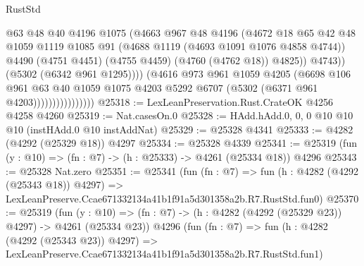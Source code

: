 \begin{lexlean}{RustStd}
\begin{coremodule}
                                    @63
                                    @48
                                    @40
                                    @4196
                                    @1075
                                    (@4663
                                      @967
                                      @48
                                      @4196
                                      (@4672
                                        @18
                                        @65
                                        @42
                                        @48
                                        @1059
                                        @1119
                                        @1085
                                        @91
                                        (@4688 @1119 (@4693 @1091 @1076 @4858 @4744))
                                        @4490
                                        (@4751 @4451)
                                        (@4755 @4459)
                                        (@4760 (@4762 @18))
                                        @4825))
                                    @4743))
                                (@5302 (@6342 @961 @1295))))
                            (@4616
                              @973
                              @961
                              @1059
                              @4205
                              (@6698
                                @106
                                @961
                                @63
                                @40
                                @1059
                                @1075
                                @4203
                                @5292
                                @6707
                                (@5302 (@6371 @961 @4203))))))))))))))))
@25318 := LexLeanPreservation.Rust.CrateOK @4256 @4258 @4260
@25319 := Nat.casesOn.{0}
@25328 := HAdd.hAdd.{0, 0, 0} @10 @10 @10 (instHAdd.{0} @10 instAddNat)
@25329 := @25328 @4341
@25333 := @4282 (@4292 (@25329 @18)) @4297
@25334 := @25328 @4339
@25341 := @25319 (fun (y : @10) => (fn : @7) -> (h : @25333) -> @4261 (@25334 @18)) @4296
@25343 := @25328 Nat.zero
@25351 := @25341
    (fun (fn : @7) =>
    fun (h : @4282 (@4292 (@25343 @18)) @4297) =>
    LexLeanPreserve.Ccae671332134a41b1f91a5d301358a2b.R7.RustStd.fun0)
@25370 := @25319
    (fun (y : @10) => (fn : @7) -> (h : @4282 (@4292 (@25329 @23)) @4297) -> @4261 (@25334 @23))
    @4296
    (fun (fn : @7) =>
    fun (h : @4282 (@4292 (@25343 @23)) @4297) =>
    LexLeanPreserve.Ccae671332134a41b1f91a5d301358a2b.R7.RustStd.fun1)

\end{coremodule}
\end{lexlean}
